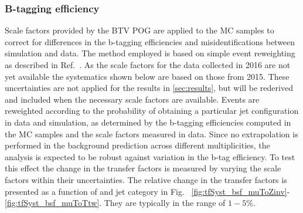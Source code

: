 \subsubsection*{B-tagging efficiency}
\label{sec:tfSyst_btag}
Scale factors provided by the BTV POG are applied to the MC samples
to correct for differences in the b-tagging efficiencies and 
misidentifications between simulation and data. 
The method employed is
based on simple event reweighting as described in
Ref.~\cite{btagSFMethods}. As the scale factors for the data collected in
2016 are not yet available the systematics shown below are based 
on those from 2015. These uncertainties are not applied for the results in \ref{sec:results},
but will be rederived and included when the necessary scale factors are available.
Events are reweighted according to the probability of obtaining a particular jet configuration in data
and simulation, as determined by the b-tagging efficiencies computed
in the MC samples and the scale factors measured in data.
Since no extrapolation is performed in the background prediction across different 
\nb  multiplicities, the analysis is expected to be robust against variation in the 
b-tag efficiency. 
To test this effect the change in the transfer factors is measured
by varying the scale factors within their uncertainties. 
The relative change in the transfer factors is presented as a function of \scalht and jet category 
in Fig. ~\ref{fig:tfSyst_bsf_muToZinv}-\ref{fig:tfSyst_bsf_muToTtw}.
They are typically in the range of $1-5\%$.


